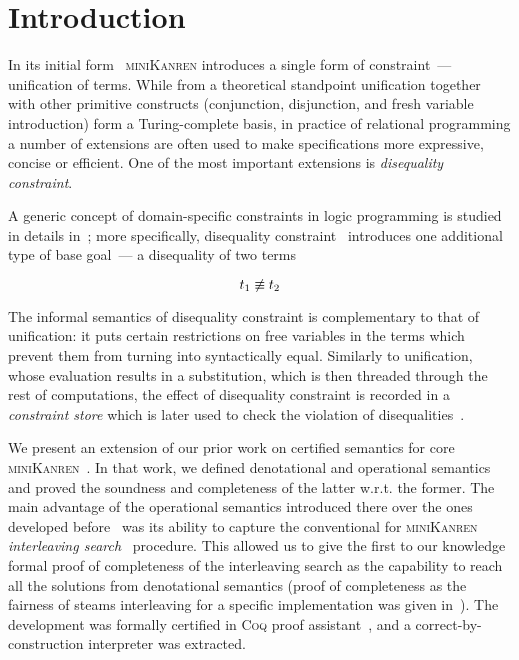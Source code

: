 \section{Introduction}

In its initial form~\cite{TRS,MicroKanren} \textsc{miniKanren} introduces a single
form of constraint~--- unification of terms. While from a theoretical standpoint unification together with other primitive constructs (conjunction, disjunction, and
fresh variable introduction) form a Turing-complete basis, in practice of relational programming a number of extensions are often used to make specifications more
expressive, concise or efficient. One of the most important extensions is \emph{disequality constraint}.

A generic concept of domain-specific constraints in logic programming is studied in details in~\cite{CLP}; more specifically, disequality constraint~\cite{Disunification}
introduces one additional type of base goal~--- a disequality of two terms

\[
t_1 \not\equiv t_2
\]

The informal semantics of disequality constraint is complementary to that of unification: it puts certain restrictions on free variables in the terms which
prevent them from turning into syntactically equal. Similarly to unification, whose evaluation results in a substitution, which is then threaded through
the rest of computations, the effect of disequality constraint is recorded in a \emph{constraint store} which is later used to check the violation of
disequalities~\cite{CKanren}.

We present an extension of our prior work on certified semantics for core \textsc{miniKanren}~\cite{CertifiedSemantics}. In that work, we
defined denotational and operational semantics and proved the soundness and completeness of the latter w.r.t. the former. 
The main advantage of the operational semantics introduced there over the ones developed before~\cite{MechanisingMiniKanren, RelConversion, DivTest}
was its ability to capture the conventional for \textsc{miniKanren} \emph{interleaving search}~\cite{Search} procedure.
This allowed us to give the first to our knowledge formal proof of completeness of the interleaving search
as the capability to reach all the solutions from denotational semantics
(proof of completeness as the fairness of steams interleaving for a specific implementation was given in~\cite{SmallEmbedding}).
The development was formally certified in \textsc{Coq} proof assistant~\cite{Coq}, and a correct-by-construction interpreter was extracted.

